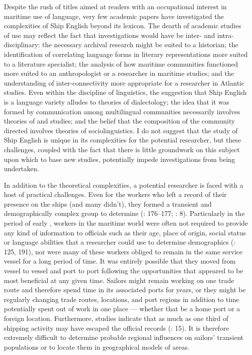Despite the rush of titles aimed at readers with an occupational interest in maritime use of language, very few academic papers have investigated the complexities of Ship English beyond its lexicon.  The dearth of academic studies of  use may reflect the fact that investigations would have be inter- and intra-disciplinary: the necessary archival research might be suited to a historian; the identification of correlating language forms in literary representations more suited to a literature specialist; the analysis of how maritime communities functioned more suited to an anthropologist or a researcher in maritime studies; and the understanding of inter-connectivity more appropriate for a researcher in Atlantic studies. Even within the discipline of linguistics, the suggestion that Ship English is a language variety alludes to theories of dialectology; the idea that it was formed by communication among multilingual communities necessarily involves theories of  and  studies; and the belief that the composition of the community directed  involves theories of sociolinguistics. I do not suggest that the study of Ship English is unique in its complexities for the potential researcher, but these challenges, coupled with the fact that there is little groundwork on this subject upon which to base new studies, potentially impede investigations from being undertaken. 



In addition to the theoretical complexities, a potential researcher is faced with a host of practical challenges. Even for the workers who left a record of their presence on the ships (and many didn’t), they formed a transient and demographically complex group to determine (\citealt{AdkinsAdkins2008}: 176–177; \citealt{Fusaro2015}: 8). Particularly in the period of early , workers in the maritime world were often not required to provide any kind of information to officials such as their age, place of origin, social status or language abilities that a researcher could use to determine demographics (\citealt{Litter1999}: 125, 191), nor were many of these workers obliged to remain in the same service vessel for a long period of time. It was entirely possible that they moved from vessel to vessel and port to port following the opportunities that appeared to be most beneficial at any given time. Sailors might remain working on one trade route and therefore spend time in its associated ports for years, or they might be regularly changing trade routes, locations, and port regions in addition to time potentially spent out of work in one place — whether that be a home port or a foreign location. Furthermore, studies indicate that as much as one third of shipping activity may have escaped the official records (\citealt{Cook2005}: 15). It is therefore extremely difficult to determine probable regional influences on sailors’ transient populations or to locate them in geographical models of  areas.



